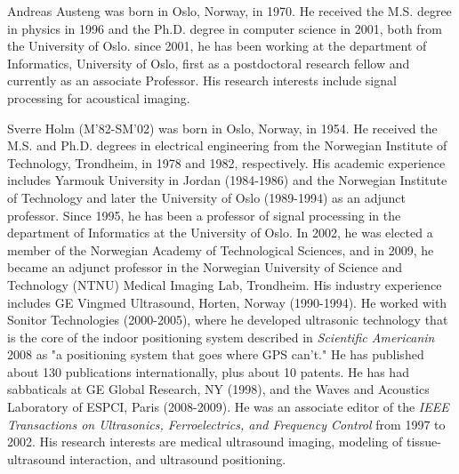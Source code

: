 \documentclass[journal]{IEEEtran}
\begin{document}

\begin{IEEEbiography}{Andreas Austeng}
was born in Oslo, Norway, in 1970. He received the M.S. degree in physics in 1996 and the Ph.D. degree in computer science in 2001, both from the University of Oslo. since 2001, he has been working at the department of Informatics, University of Oslo, first as a postdoctoral research fellow and currently as an associate Professor. His research interests include signal processing for acoustical imaging.
\end{IEEEbiography}

\newpage

\begin{IEEEbiography}{Sverre Holm}
(M’82-SM’02) was born in Oslo, Norway, in 1954. He received the M.S. and Ph.D. degrees in electrical engineering from the Norwegian Institute of Technology, Trondheim, in 1978 and 1982, respectively. His academic experience includes Yarmouk University in Jordan (1984-1986) and the Norwegian Institute of Technology and later the University of Oslo (1989-1994) as an adjunct professor. Since 1995, he has been a professor of signal processing in the department of Informatics at the University of Oslo. In 2002, he was elected a member of the Norwegian Academy of Technological Sciences, and in 2009, he became an adjunct professor in the Norwegian University of Science and Technology (NTNU) Medical Imaging Lab, Trondheim. His industry experience includes GE Vingmed Ultrasound, Horten, Norway (1990-1994). He worked with Sonitor Technologies (2000-2005), where he developed ultrasonic technology that is the core of the indoor positioning system described in \textit{Scientific Americanin} 2008 as "a positioning system that goes where GPS can’t." He has published about 130 publications internationally, plus about 10 patents. He has had sabbaticals at GE Global Research, NY (1998), and the Waves and 
Acoustics Laboratory of ESPCI, Paris (2008-2009). He was an associate editor of the \textit{IEEE Transactions on Ultrasonics, Ferroelectrics, and Frequency Control} from 1997 to 2002. His research interests are medical ultrasound imaging, modeling of tissue-ultrasound interaction, and ultrasound positioning.
\end{IEEEbiography}
\end{document}
